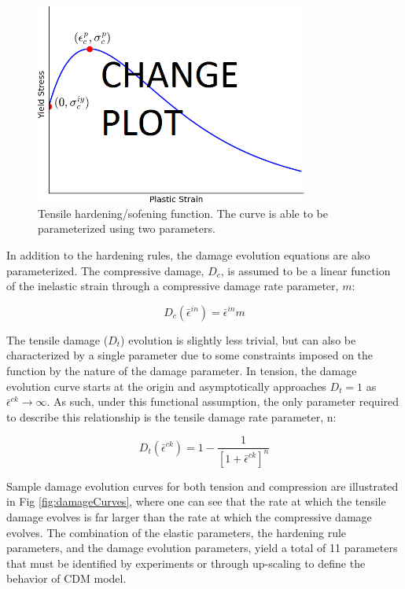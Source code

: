 \begin{figure}[!htb]
\begin{center}
\includegraphics[width=0.8\textwidth]{figures/Chapter3/TensionHardening}
\caption{{\label{fig:tensionHardening} Tensile hardening/sofening function. The curve is able to be parameterized using two parameters.%
}}
\end{center}
\end{figure}

In addition to the hardening rules, the damage evolution equations are also parameterized. The compressive damage, $D_c$, is assumed to be a linear function of the inelastic strain through a compressive damage rate parameter, $m$:

\begin{equation}
D_{c}\left(\bar{\epsilon}^{in}\right)=\bar{\epsilon}^{in}m\label{eqn:param3}
\end{equation}

The tensile damage ($D_{t}$) evolution is slightly less trivial, but can also be characterized by a single parameter due to some constraints imposed on the function by the nature of the damage parameter. In
tension, the damage evolution curve starts at the origin and asymptotically approaches $D_{t}=1$ as $\bar{\epsilon}^{ck}\rightarrow\infty$. As such, under this functional assumption, the only parameter required to describe this relationship is the tensile damage rate parameter, n:

\begin{equation}
D_{t}\left(\bar{\epsilon}^{ck}\right)=1-\frac{1}{\left[1+\bar{\epsilon}^{ck}\right]^{n}}\label{eqn:param4}
\end{equation}

Sample damage evolution curves for both tension and compression are illustrated in Fig \ref{fig:damageCurves}, where one can see that the rate at which the tensile damage evolves is far larger than the rate at which the compressive damage evolves. The combination of the elastic parameters, the hardening rule parameters, and the damage evolution parameters, yield a total of 11 parameters that must be identified by experiments or through up-scaling to define the behavior of CDM model.

